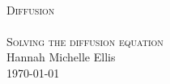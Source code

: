\begin{titlepage}
\begin{center}
\HRule \\[0.5cm]
\textsc{\huge Diffusion}\\[0.5cm]
\HRule \\[0.5cm]
\textsc{\Large Solving the diffusion equation}\\[0.5cm]
\vfill
Hannah Michelle Ellis\\[1.0cm]
\today
\end{center}
\end{titlepage}
